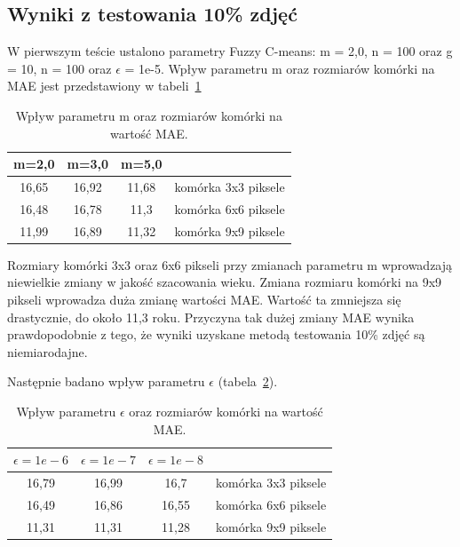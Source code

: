 \documentclass[a4paper,twoside,12pt]{book}
\begin{document}
    \subsection*{Wyniki z testowania 10\% zdjęć}
    W pierwszym teście ustalono parametry Fuzzy C-means: m = 2,0, n = 100 oraz g = 10, n = 100
    oraz $\epsilon$ = 1e-5.
    Wpływ parametru m oraz rozmiarów komórki na MAE jest przedstawiony w tabeli~\ref{tab.hog}
    \begin{table}[h!]
        \centering
        \caption{Wpływ parametru m oraz rozmiarów komórki na wartość MAE.}
        \begin{tabular}{|c|c|c|c|}
            \hline
            m=2,0 & m=3,0 & m=5,0 &                     \\ \hline
            16,65 & 16,92 & 11,68 & komórka 3x3 piksele \\ \hline
            16,48 & 16,78 & 11,3 & komórka 6x6 piksele \\ \hline
            11,99 & 16,89 & 11,32 & komórka 9x9 piksele \\ \hline
        \end{tabular}
        \label{tab.hog}
    \end{table}
    Rozmiary komórki 3x3 oraz 6x6 pikseli przy zmianach parametru m wprowadzają niewielkie zmiany w jakość
    szacowania wieku. Zmiana rozmiaru komórki na 9x9 pikseli wprowadza duża zmianę wartości MAE. Wartość ta
    zmniejsza się drastycznie, do około 11,3 roku. Przyczyna tak dużej zmiany MAE wynika prawdopodobnie z tego, że
    wyniki uzyskane metodą testowania 10\% zdjęć są niemiarodajne.

    Następnie badano wpływ parametru $\epsilon$ (tabela~\ref{tab.hog1}).
    \begin{table}[h!]
        \centering
        \caption{Wpływ parametru $\epsilon$ oraz rozmiarów komórki na wartość MAE.}
        \begin{tabular}{|c|c|c|c|}
            \hline
            $\epsilon=1e-6$ &  $\epsilon=1e-7$ &  $\epsilon=1e-8$ &                     \\ \hline
            16,79 & 16,99 & 16,7 & komórka 3x3 piksele \\ \hline
            16,49 & 16,86 & 16,55 & komórka 6x6 piksele \\ \hline
            11,31 & 11,31 & 11,28 & komórka 9x9 piksele \\ \hline
        \end{tabular}
        \label{tab.hog1}
    \end{table}
\end{document}
